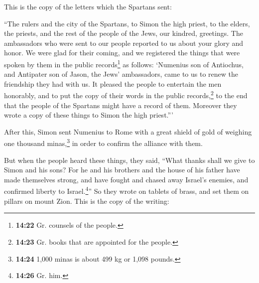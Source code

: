  This is the copy of the letters which the Spartans sent:

``The rulers and the city of the Spartans, to Simon the high priest, to
the elders, the priests, and the rest of the people of the Jews, our
kindred, greetings.  The ambassadors who were sent to our
people reported to us about your glory and honor. We were glad for their
coming,  and we registered the things that were spoken by
them in the public records\footnote{\textbf{14:22} Gr. counsels of the
  people.} as follows: `Numenius son of Antiochus, and Antipater son of
Jason, the Jews' ambassadors, came to us to renew the friendship they
had with us.  It pleased the people to entertain the men
honorably, and to put the copy of their words in the public
records,\footnote{\textbf{14:23} Gr. books that are appointed for the
  people.} to the end that the people of the Spartans might have a
record of them. Moreover they wrote a copy of these things to Simon the
high priest.'''

 After this, Simon sent Numenius to Rome with a great
shield of gold of weighing one thousand minas,\footnote{\textbf{14:24}
  1,000 minas is about 499 kg or 1,098 pounds.} in order to confirm the
alliance with them.

 But when the people heard these things, they said,
``What thanks shall we give to Simon and his sons?  For
he and his brothers and the house of his father have made themselves
strong, and have fought and chased away Israel's enemies, and confirmed
liberty to Israel.\footnote{\textbf{14:26} Gr. him.}'' 
So they wrote on tablets of brass, and set them on pillars on mount
Zion. This is the copy of the writing:

